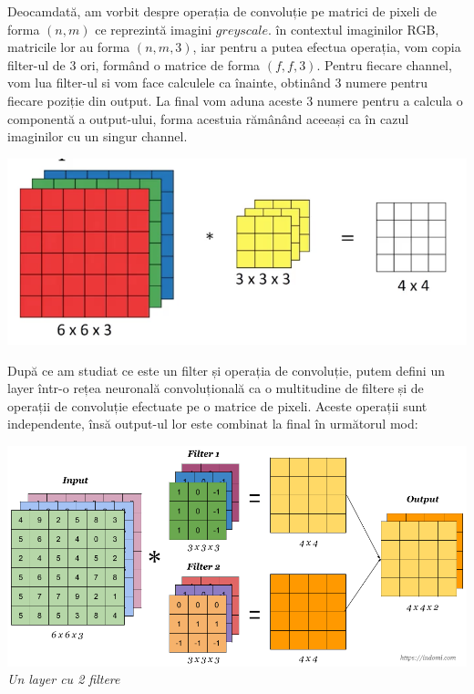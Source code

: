 Deocamdată, am vorbit despre operația de convoluție pe matrici de pixeli de forma $(n,m)$ ce reprezintă imagini $greyscale$. în contextul imaginilor RGB, matricile lor au forma $(n,m,3)$, iar pentru a putea efectua operația, vom copia filter-ul de 3 ori, formând o matrice de forma $(f,f,3)$. Pentru fiecare channel, vom lua filter-ul si vom face calculele ca înainte, obtinând 3 numere pentru fiecare poziție din output. La final vom aduna aceste 3 numere pentru a calcula o componentă a output-ului, forma acestuia rămânând aceeași ca în cazul imaginilor cu un singur channel.

\begin{center}
\includegraphics[scale=0.4]{convVolumes} \\
\end{center}

După ce am studiat ce este un filter și operația de convoluție, putem defini un layer într-o rețea neuronală convoluțională ca o multitudine de filtere și de operații de convoluție efectuate pe o matrice de pixeli. Aceste operații sunt independente, însă output-ul lor este combinat la final în următorul mod:

\begin{center}
\includegraphics[scale=0.4]{convLayer} \\
\textit{Un layer cu 2 filtere}
\end{center}

